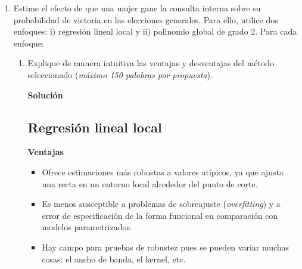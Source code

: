 \documentclass[a4paper, answers, addpoints, 11pt]{exam}
\newenvironment{solucion}{%
  \begin{mdframed}[
    backgroundcolor=blue!5,    %
    linecolor=blue!50,          %
    linewidth=2pt,              %
    leftmargin=10pt,            %
    rightmargin=8pt,           %
    topline=true,              %
    bottomline=true,            %
    roundcorner=10pt,           %
    innerleftmargin=10pt,       %
    innerrightmargin=10pt,      %
    innerbottommargin=10pt,     %
    innertopmargin=10pt         %
  ]%
  \begin{tcolorbox}[colframe=blue!50!black, colback=blue!50, coltitle=white, sharp corners=all, boxrule=1mm, width=\textwidth, halign=left, valign=center, top=0mm, bottom=0mm, left=0mm, right=0mm] \textbf{Solución} \end{tcolorbox} }{\end{mdframed}}
\begin{document}
\begin{enumerate}[resume]
\begin{enumerate}
\begin{solucion}
Este efecto sería indicativo de un sesgo de género que puede existir en la sociedad. En donde a los partidos que están nominando a hombres les va mejor que a los que están nominando mujeres. Una posible explicación de este sesgo de género puede atribuirse a pre-concepciones o diferencias en cuanto a la manera de hombre y mujeres de hacer política. Cuando las candidatas ganan las primarias con márgenes muy estrechos, no logran consolidar el respaldo total del partido, lo que podría llevar a divisiones internas, menor cohesión y pérdida de apoyo en la campaña general, a su vez pueden tener niveles de ética más elevados y pueden inclinarse por formas más convencionales y aceptables de hacer campaña. Por otro lado, cuando las mujeres pierden, es decir cuando los hombres ganan por margenes muy estrechos, pueden ser más arriesgados en la forma como hacen campaña y en algunas ocasiones poner en riesgo su candidatura.\\ 

Hay muchas teorías detrás y esta es solo una de ellas, pero el punto es que en el caso ideal uno esperaría no encontrar ningún efecto. Sin embargo, la gráfica enciende una preocupación sobre una posible desventaja que tengan las mujeres en el quehacer político e invita a reflexionar sobre las dinámicas internas de los partidos y posibles desigualdades de género en la política electoral
\end{solucion}
    \end{enumerate}

    \item Estime el efecto de que una mujer gane la consulta interna sobre su probabilidad de victoria en las elecciones generales. Para ello, utilice dos enfoques: i) regresión lineal local y ii) polinomio global de grado 2. Para cada enfoque:

    \begin{enumerate}

        \item Explique de manera intuitiva las ventajas y desventajas del método seleccionado (\textit{máximo 150 palabras por propuesta}).
\begin{solucion}
\subsection*{Regresión lineal local}
\textbf{Ventajas }

\begin{itemize}
     \item Ofrece estimaciones más robustas a valores atípicos, ya que ajusta una recta en un entorno local alrededor del punto de corte.
    \item Es menos susceptible a problemas de sobreajuste (\textit{overfitting}) y a error de especificación de la forma funcional en comparación con modelos parametrizados.
    \item Hay campo para pruebas de robustez pues se pueden variar muchas cosas: el ancho de banda, el kernel, etc.
\end{itemize}


\end{solucion}
\end{enumerate}
\end{enumerate}
\end{document}
